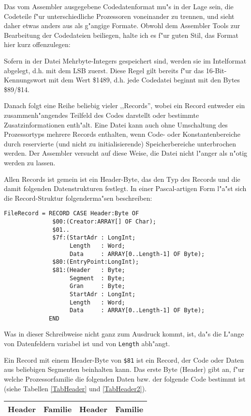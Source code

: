 \documentclass[12pt,a4paper,twoside]{report}
\begin{document}
{Das vom Assembler ausgegebene Codedatenformat mu"s in der Lage sein,
die Codeteile f"ur unterschiedliche Prozessoren voneinander zu trennen,
und sieht daher etwas anders aus als g"angige Formate.  Obwohl dem
Assembler Tools zur Bearbeitung der Codedateien beiliegen, halte ich es
f"ur guten Stil, das Format hier kurz offenzulegen:
\par
Sofern in der Datei Mehrbyte-Integers gespeichert sind, werden sie
im Intelformat abgelegt, d.h. mit dem LSB zuerst.  Diese Regel gilt
bereits f"ur das 16-Bit-Kennungswort mit dem Wert \$1489, d.h. jede
Codedatei beginnt mit den Bytes \$89/\$14.
\par
Danach folgt eine Reihe beliebig vieler ,,Records'', wobei ein Record
entweder ein zusammenh"angendes Teilfeld des Codes darstellt oder bestimmte 
Zusatzinformationen enth"alt.  Eine Datei
kann auch ohne Umschaltung des Prozessortyps mehrere Records enthalten,
wenn Code- oder Konstantenbereiche durch reservierte (und nicht zu
initialisierende) Speicherbereiche unterbrochen werden.  Der Assembler
versucht auf diese Weise, die Datei nicht l"anger als n"otig werden
zu lassen.
\par
Allen Records ist gemein ist ein Header-Byte, das den Typ des Records
und die damit folgenden Datenstrukturen festlegt.  In einer Pascal-artigen
Form l"a"st sich die Record-Struktur folgenderma"sen beschreiben:
\begin{verbatim}
FileRecord = RECORD CASE Header:Byte OF
              $00:(Creator:ARRAY[] OF Char);
              $01..
              $7f:(StartAdr : LongInt;
                   Length   : Word;
                   Data     : ARRAY[0..Length-1] OF Byte);
              $80:(EntryPoint:LongInt);
              $81:(Header   : Byte;
                   Segment  : Byte;
                   Gran     : Byte;
                   StartAdr : LongInt;
                   Length   : Word;
                   Data     : ARRAY[0..Length-1] OF Byte);
             END
\end{verbatim}
Was in dieser Schreibweise nicht ganz zum Ausdruck kommt, ist, da"s
die L"ange von Datenfeldern variabel ist und von {\tt Length} abh"angt.
\par
Ein Record mit einem Header-Byte von \verb!$81! ist ein Record, der Code
oder Daten aus beliebigen Segmenten beinhalten kann.  Das erste
Byte (Header) gibt an, f"ur welche Prozessorfamilie die folgenden
Daten bzw. der folgende  Code bestimmt ist (siehe Tabellen \ref{TabHeader}
und \ref{TabHeader2}).  

\begin{table*}[htbp]
\begin{center}\begin{tabular}{|c|l||c|l|}
\hline
Header & Familie & Header & Familie \\
\hline
\hline

\end{tabular}\end{center}
\caption{Headerbytes f"ur die verschiedenen Prozessorfamilien\label{TabHeader}}
\end{table*}

}
\end{document}
